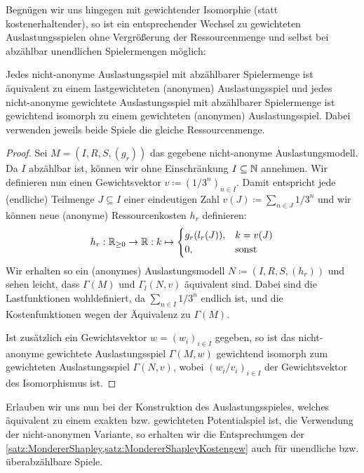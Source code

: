 Begnügen wir uns hingegen mit gewichtender Isomorphie (statt kostenerhaltender), so ist ein entsprechender Wechsel zu gewichteten Auslastungsspielen ohne Vergrößerung der Ressourcenmenge und selbst bei abzählbar unendlichen Spielermengen möglich:

\begin{satz}\label{satz:NichtAnonymeAusl}
	Jedes nicht-anonyme Auslastungsspiel mit abzählbarer Spielermenge ist äquivalent zu einem lastgewichteten (anonymen) Auslastungsspiel und jedes nicht-anonyme gewichtete Auslastungsspiel mit abzählbarer Spielermenge ist gewichtend isomorph zu einem gewichteten (anonymen) Auslastungsspiel. Dabei verwenden jeweils beide Spiele die gleiche Ressourcenmenge.
\end{satz}

\begin{proof}
	Sei $M = (I, R, S, (g_r))$ das gegebene nicht-anonyme Auslastungsmodell. Da $I$ abzählbar ist, können wir ohne Einschränkung $I \subseteq \mathbb{N}$ annehmen. Wir definieren nun einen Gewichtsvektor $v \coloneqq (1/3^n)_{n \in I}$. Damit entspricht jede (endliche) Teilmenge $J \subseteq I$ einer eindeutigen Zahl $v(J) \coloneqq \sum_{n \in J} 1/3^n$ und wir können neue (anonyme) Ressourcenkosten $h_r$ definieren:
	\[h_r: \mathbb{R}_{\geq 0} \to \mathbb{R}: k \mapsto \begin{cases}
	g_r(l_r(J)), 	&k = v(J) \\
	0,				&\text{sonst}
	\end{cases} \]
	Wir erhalten so ein (anonymes) Auslastungsmodell $N \coloneqq (I, R, S, (h_r))$ und sehen leicht, dass $\Gamma(M)$ und $\Gamma_l(N, v)$ äquivalent sind. Dabei sind die Lastfunktionen wohldefiniert, da $\sum_{n \in I} 1/3^n$ endlich ist, und die Kostenfunktionen wegen der Äquivalenz zu $\Gamma(M)$. 
	
	Ist zusätzlich ein Gewichtsvektor $w = (w_i)_{i\in I}$ gegeben, so ist das nicht-anonyme gewichtete Auslastungsspiel $\Gamma(M, w)$ gewichtend isomorph zum gewichteten Auslastungsspiel $\Gamma(N, v)$, wobei $(w_i/v_i)_{i \in I}$ der Gewichtsvektor des Isomorphismus ist.
\end{proof}

Erlauben wir uns nun bei der Konstruktion des Auslastungsspieles, welches äquivalent zu einem exakten bzw. gewichteten Potentialspiel ist, die Verwendung der nicht-anonymen Variante, so erhalten wir die Entsprechungen der \cref{satz:MondererShapley,satz:MondererShapleyKostengew} auch für unendliche bzw. überabzählbare Spiele.

